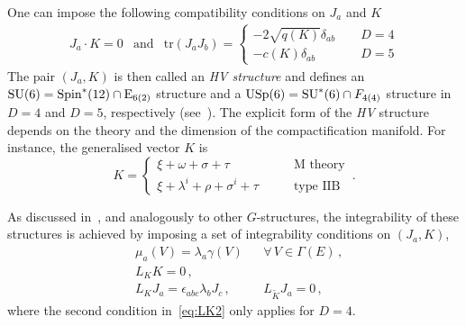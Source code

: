 \documentclass[debug]{phd}
\begin{document}
					One can impose the following compatibility conditions on $J_a$ and $K$
							\begin{equation}\label{compHV}
								\begin{array}{ccc}
									J_{a} \cdot K=0 & \mbox{and}& \mathrm{tr}\left( J_{a}J_{b}\right) =
									\begin{cases}
										-2 \sqrt{q(K)} \delta_{ab}&\phantom{\mbox{for}} D=4\\
										-c(K) \delta_{ab}&\phantom{\mbox{for}} D=5 
									\end{cases}
								\end{array}
							\end{equation}
					The pair $(J_{a}, K)$ is then called an \emph{HV structure} and defines an $\mathrm{SU}(6) = \mathrm{Spin}^*(12) \cap \mathrm{E}_{6(2)}$ structure and a $\mathrm{USp}(6) = \mathrm{SU}^*(6) \cap F_{4(4)} $ structure in $D=4$ and $D=5$, respectively (see~\cite{AshmoreECY}). 
					The explicit form of the \emph{HV} structure depends on the theory and the dimension of the compactification manifold. 
					For instance, the generalised vector $K$ is 
							\begin{equation}\label{genvecs}
								K = \left\{ \begin{array}{lcl} 
										\xi + \omega + \sigma + \tau & \phantom{\mbox{for}} & \mbox{M theory} \\[1mm]
										\xi + \lambda^i + \rho + \sigma^i + \tau & \phantom{\mbox{for}} & \mbox{type IIB}
									\end{array} \right. \, .
							\end{equation}
						
					As discussed in~\cite{AshmoreECY, AshmoreESE}, and analogously to other $G$-structures, the integrability of these structures is achieved by imposing a set of integrability conditions on $(J_a, K)$,
							\begin{subequations}
								\begin{align} 
								\label{eq:moment_map}
									&& &\mu_{a} (V) = \lambda_{a} \gamma(V) && \forall \, V \in \Gamma(E)\, , && \\
								\label{eq:LK1}
									&& &L_{K}K=0\, ,\\
								\label{eq:LK2}
									&& &L_K J_a = \epsilon_{a b c} \lambda_{b} J_{c} \, , && L_{\tilde K} J_{a} =0 \, , &&
								\end{align}
							\end{subequations}
					where the second condition in~\eqref{eq:LK2} only applies for $D=4$.
					
\end{document}
